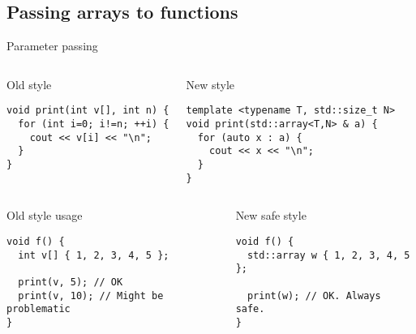 \subsection{Passing arrays to functions}

\begin{frame}[t,fragile]{Parameter passing}
\begin{columns}[T]
\begin{block}{Old style}
\begin{lstlisting}
void print(int v[], int n) {
  for (int i=0; i!=n; ++i) {
    cout << v[i] << "\n";
  }
}
\end{lstlisting}
\end{block}

\pause

\begin{block}{New style}
\begin{lstlisting}
template <typename T, std::size_t N>
void print(std::array<T,N> & a) {
  for (auto x : a) {
    cout << x << "\n";
  }
}
\end{lstlisting}
\end{block}
\end{columns}

\begin{columns}[T]
\begin{block}{Old style usage}
\begin{lstlisting}
void f() {
  int v[] { 1, 2, 3, 4, 5 };

  print(v, 5); // OK
  print(v, 10); // Might be problematic
}
\end{lstlisting}
\end{block}

\pause
{}
\begin{block}{New safe style}
\begin{lstlisting}
void f() {
  std::array w { 1, 2, 3, 4, 5 };

  print(w); // OK. Always safe.
}

\end{lstlisting}
\end{block}
\end{columns}
\end{frame}
